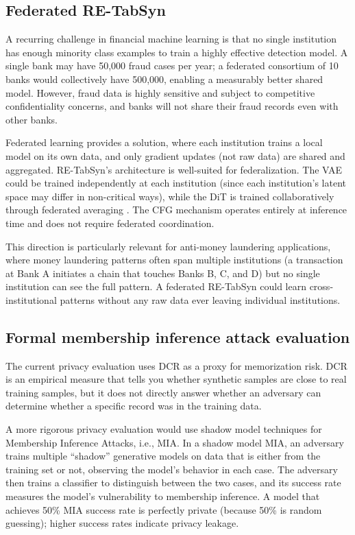 \subsection{Federated RE-TabSyn}

A recurring challenge in financial machine learning is that no single institution has enough minority class examples to train a highly effective detection model. A single bank may have 50,000 fraud cases per year; a federated consortium of 10 banks would collectively have 500,000, enabling a measurably better shared model. However, fraud data is highly sensitive and subject to competitive confidentiality concerns, and banks will not share their fraud records even with other banks.

Federated learning provides a solution, where each institution trains a local model on its own data, and only gradient updates (not raw data) are shared and aggregated. RE-TabSyn's architecture is well-suited for federalization. The VAE could be trained independently at each institution (since each institution's latent space may differ in non-critical ways), while the DiT is trained collaboratively through federated averaging \cite{mcmahan2017fedavg}. The CFG mechanism operates entirely at inference time and does not require federated coordination.

This direction is particularly relevant for anti-money laundering applications, where money laundering patterns often span multiple institutions (a transaction at Bank A initiates a chain that touches Banks B, C, and D) but no single institution can see the full pattern. A federated RE-TabSyn could learn cross-institutional patterns without any raw data ever leaving individual institutions.

\subsection{Formal membership inference attack evaluation}

The current privacy evaluation uses DCR as a proxy for memorization risk. DCR is an empirical measure that tells you whether synthetic samples are close to real training samples, but it does not directly answer whether an adversary can determine whether a specific record was in the training data.

A more rigorous privacy evaluation would use shadow model techniques for Membership Inference Attacks, i.e., MIA. In a shadow model MIA, an adversary trains multiple ``shadow'' generative models on data that is either from the training set or not, observing the model's behavior in each case. The adversary then trains a classifier to distinguish between the two cases, and its success rate measures the model's vulnerability to membership inference. A model that achieves 50\% MIA success rate is perfectly private (because 50\% is random guessing); higher success rates indicate privacy leakage.

